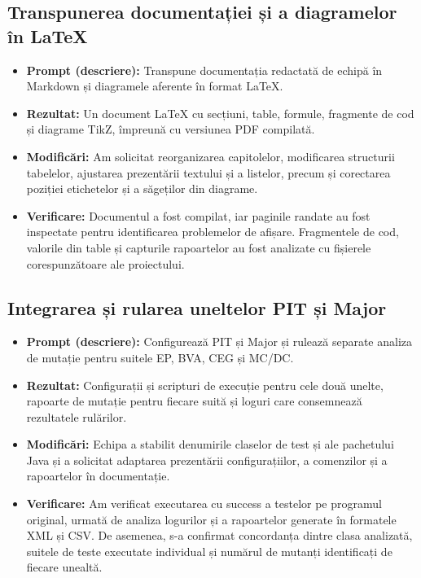 \documentclass[11pt,a4paper]{article}
\begin{document}
\subsection{Transpunerea documentației și a diagramelor în LaTeX}
\begin{itemize}[label=\textendash]
\item \textbf{Prompt (descriere):} Transpune documentația redactată de echipă în Markdown și diagramele aferente în format LaTeX.
\item \textbf{Rezultat:} Un document LaTeX cu secțiuni, table, formule, fragmente de cod și diagrame TikZ, împreună cu versiunea PDF compilată.
\item \textbf{Modificări:} Am solicitat reorganizarea capitolelor, modificarea structurii tabelelor, ajustarea prezentării textului și a listelor, precum și corectarea poziției etichetelor și a săgeților din diagrame.
\item \textbf{Verificare:} Documentul a fost compilat, iar paginile randate au fost inspectate pentru identificarea problemelor de afișare. Fragmentele de cod, valorile din table și capturile rapoartelor au fost analizate cu fișierele corespunzătoare ale proiectului.
\end{itemize}

\subsection{Integrarea și rularea uneltelor PIT și Major}
\begin{itemize}[label=\textendash]
\item \textbf{Prompt (descriere):} Configurează PIT și Major și rulează separate analiza de mutație pentru suitele EP, BVA, CEG și MC/DC.
\item \textbf{Rezultat:} Configurații și scripturi de execuție pentru cele două unelte, rapoarte de mutație pentru fiecare suită și loguri care consemnează rezultatele rulărilor.
\item \textbf{Modificări:} Echipa a stabilit denumirile claselor de test și ale pachetului Java și a solicitat adaptarea prezentării configurațiilor, a comenzilor și a rapoartelor în documentație.
\item \textbf{Verificare:} Am verificat executarea cu success a testelor pe programul original, urmată de analiza logurilor și a rapoartelor generate în formatele XML și CSV. De asemenea, s-a confirmat concordanța dintre clasa analizată, suitele de teste executate individual și numărul de mutanți identificați de fiecare unealtă.
\end{itemize}
\end{document}
